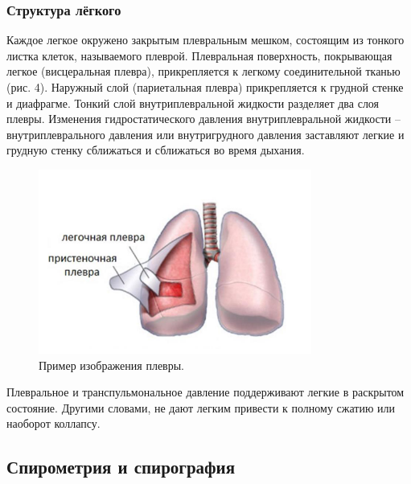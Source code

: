 \documentclass{article}
\begin{document}
        \subsubsection*{Структура лёгкого}

            \hspace*{4mm} Каждое легкое окружено закрытым плевральным мешком, состоящим из
            тонкого листка клеток, называемого плеврой. Плевральная поверхность,
            покрывающая легкое (висцеральная плевра), прикрепляется к легкому
            соединительной тканью (рис. 4). Наружный слой (париетальная плевра)
            прикрепляется к грудной стенке и диафрагме. Тонкий слой внутриплевральной
            жидкости разделяет два слоя плевры. Изменения гидростатического давления
            внутриплевральной жидкости – внутриплеврального давления или
            внутригрудного давления заставляют легкие и грудную стенку сближаться и
            сближаться во время дыхания.

            \begin{figure}[h]
                \centering
                \includegraphics*[width=0.8\textwidth]{Плевра.png}
                \caption{Пример изображения плевры.}
            \end{figure}

            Плевральное и транспульмональное давление поддерживают легкие в
            раскрытом состояние. Другими словами, не дают легким привести к полному
            сжатию или наоборот коллапсу.
            \newpage

        \subsection*{Спирометрия и спирография}
\end{document}
